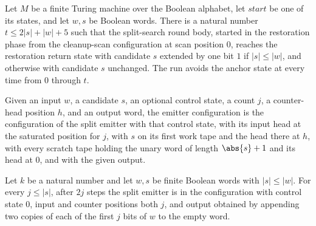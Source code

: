 \begin{lemma}
\label{Turing.FinTM.splitBody_restore}
\leanok
{}
Let $M$ be a finite Turing machine over the Boolean alphabet, let $start$ be one of its
states, and let $w,s$ be Boolean words. There is a natural number $t\le 2|s|+|w|+5$ such
that the split-search round body, started in the restoration phase from the cleanup-scan
configuration at scan position $0$, reaches the restoration return state with candidate
$s$ extended by one bit $1$ if $|s|\le |w|$, and otherwise with candidate $s$ unchanged.
The run avoids the anchor state at every time from $0$ through $t$.
\end{lemma}

\begin{definition}
\label{Turing.FinTM.splitEmitCfg}
\leanok
{}
Given an input $w$, a candidate $s$, an optional control state, a count $j$,
a counter-head position $h$, and an output word, the emitter configuration
is the configuration of the split emitter with that control state, with its
input head at the saturated position for $j$, with $s$ on its first work
tape and the head there at $h$, with every scratch tape holding the unary
word of length $\abs{s}+1$ and its head at $0$, and with the given output.
\end{definition}

\begin{lemma}
\label{Turing.FinTM.splitEmit_double}
\leanok
{}
Let $k$ be a natural number and let $w,s$ be finite Boolean words with $|s|\le |w|$. For
every $j\le |s|$, after $2j$ steps the split emitter is in the configuration with
control state $0$, input and counter positions both $j$, and output obtained by
appending two copies of each of the first $j$ bits of $w$ to the empty word.
\end{lemma}

